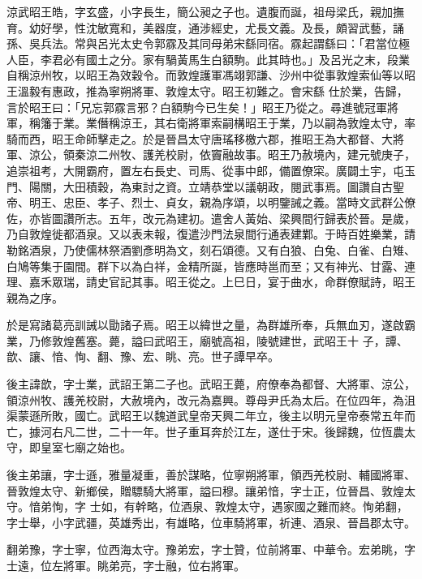 \begin{pinyinscope}
 涼武昭王皓，字玄盛，小字長生，簡公昶之子也。遺腹而誕，祖母梁氏，親加撫育。幼好學，性沈敏寬和，美器度，通涉經史，尤長文義。及長，頗習武藝，誦孫、吳兵法。常與呂光太史令郭霡及其同母弟宋繇同宿。霡起謂繇曰：「君當位極人臣，李君必有國土之分。家有騧黃馬生白額駒。此其時也。」及呂光之末，段業自稱涼州牧，以昭王為效穀令。而敦煌護軍馮翊郭謙、沙州中從事敦煌索仙等以昭王溫毅有惠政，推為寧朔將軍、敦煌太守。昭王初難之。會宋繇
 仕於業，告歸，言於昭王曰：「兄忘郭霡言邪？白額駒今已生矣！」昭王乃從之。尋進號冠軍將軍，稱籓于業。業僭稱涼王，其右衛將軍索嗣構昭王于業，乃以嗣為敦煌太守，率騎而西，昭王命師擊走之。於是晉昌太守唐瑤移檄六郡，推昭王為大都督、大將軍、涼公，領秦涼二州牧、護羌校尉，依竇融故事。昭王乃赦境內，建元號庚子，追崇祖考，大開霸府，置左右長史、司馬、從事中郎，備置僚寀。廣闢土宇，屯玉門、陽關，大田積穀，為東討之資。立靖恭堂以議朝政，閱武事焉。圖讚自古聖帝、明王、忠臣、孝子、烈士、貞女，親為序頌，以明鑒誡之義。當時文武群公僚
 佐，亦皆圖讚所志。五年，改元為建初。遣舍人黃始、梁興間行歸表於晉。是歲，乃自敦煌徙都酒泉。又以表未報，復遣沙門法泉間行通表建鄴。于時百姓樂業，請勒銘酒泉，乃使儒林祭酒劉彥明為文，刻石頌德。又有白狼、白兔、白雀、白雉、白鳩等集于園間。群下以為白祥，金精所誕，皆應時邕而至；又有神光、甘露、連理、嘉禾眾瑞，請史官記其事。昭王從之。上巳日，宴于曲水，命群僚賦詩，昭王親為之序。



 於是寫諸葛亮訓誡以勖諸子焉。昭王以緯世之量，為群雄所奉，兵無血刃，遂啟霸業，乃修敦煌舊塞。薨，謚曰武昭王，廟號高祖，陵號建世，武昭王十
 子，譚、歆、讓、愔、恂、翻、豫、宏、眺、亮。世子譚早卒。



 後主諱歆，字士業，武詔王第二子也。武昭王薨，府僚奉為都督、大將軍、涼公，領涼州牧、護羌校尉，大赦境內，改元為嘉興。尊母尹氏為太后。在位四年，為沮渠蒙遜所敗，國亡。武昭王以魏道武皇帝天興二年立，後主以明元皇帝泰常五年而亡，據河右凡二世，二十一年。世子重耳奔於江左，遂仕于宋。後歸魏，位恆農太守，即皇室七廟之始也。



 後主弟讓，字士遜，雅量凝重，善於謀略，位寧朔將軍，領西羌校尉、輔國將軍、晉敦煌太守、新鄉侯，贈驃騎大將軍，謚曰穆。讓弟愔，字士正，位晉昌、敦煌太守。愔弟恂，字
 士如，有幹略，位酒泉、敦煌太守，遇家國之難而終。恂弟翻，字士舉，小字武疆，英雄秀出，有雄略，位車騎將軍，祈連、酒泉、晉昌郡太守。



 翻弟豫，字士寧，位西海太守。豫弟宏，字士贊，位前將軍、中華令。宏弟眺，字士遠，位左將軍。眺弟亮，字士融，位右將軍。




\end{pinyinscope}
